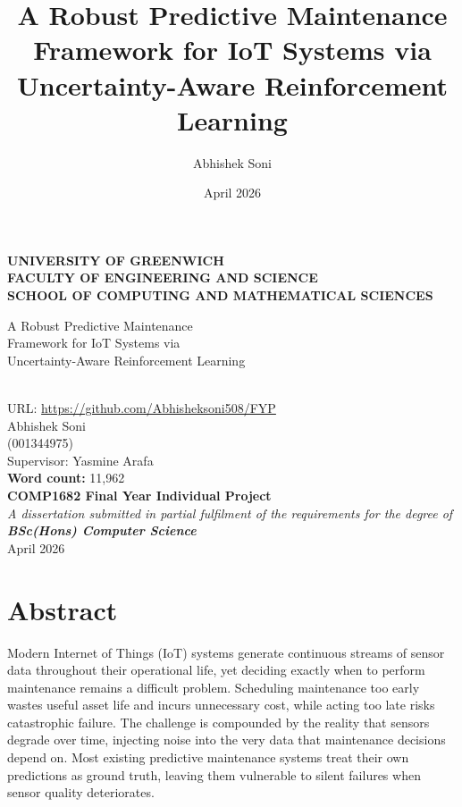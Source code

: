 \documentclass[12pt,a4paper]{report}
\title{A Robust Predictive Maintenance Framework for IoT Systems via Uncertainty-Aware Reinforcement Learning}
\author{Abhishek Soni}
\date{April 2026}
\renewcommand{\headrulewidth}{0pt}
\renewcommand{\footrulewidth}{0.4pt}
\begin{document}
\singlespacing

\hypersetup{pageanchor=false}


\begin{titlepage}
    \centering
    \vspace*{1cm}
    {\Large \textbf{UNIVERSITY OF GREENWICH}} \\[0.3cm]
    {\large \textbf{FACULTY OF ENGINEERING AND SCIENCE}} \\[0.3cm]
    {\large \textbf{SCHOOL OF COMPUTING AND MATHEMATICAL SCIENCES}} \\[2cm]

    {\LARGE\bfseries\parbox{0.9\textwidth}{\centering
    A Robust Predictive Maintenance\\
    Framework for IoT Systems via\\
    Uncertainty-Aware Reinforcement Learning}} \\[0.6cm]
    {\normalsize URL: \url{https://github.com/Abhisheksoni508/FYP}} \\[1.5cm]

    {\large Abhishek Soni} \\[0.2cm]
    {(001344975)} \\[1.5cm]

    Supervisor: Yasmine Arafa \\[0.8cm]

    \textbf{Word count:} 11,962
     \\[1.5cm]

    {\Large \textbf{COMP1682 Final Year Individual Project}} \\[0.2cm]
    \textit{A dissertation submitted in partial fulfilment of the requirements for the degree of} \\[0.2cm]
    \textbf{\textit{BSc(Hons) Computer Science}} \\[1cm]

    \vfill
    April 2026
\end{titlepage}


\pagestyle{fancy}
\fancyhf{}
\fancyfoot[R]{\thepage}
\renewcommand{\headrulewidth}{0pt}
\renewcommand{\footrulewidth}{0.4pt}

\setcounter{page}{1}
\chapter*{Abstract}
Modern Internet of Things (IoT) systems generate continuous streams of sensor data throughout their operational life, yet deciding exactly when to perform maintenance remains a difficult problem. Scheduling maintenance too early wastes useful asset life and incurs unnecessary cost, while acting too late risks catastrophic failure. The challenge is compounded by the reality that sensors degrade over time, injecting noise into the very data that maintenance decisions depend on. Most existing predictive maintenance systems treat their own predictions as ground truth, leaving them vulnerable to silent failures when sensor quality deteriorates.
\end{document}

